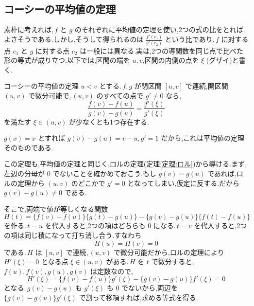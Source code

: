 \subsection{コーシーの平均値の定理}
素朴に考えれば,\,$f$ と $g$ のそれぞれに平均値の定理を使い,2つの式の比をとればよさそうである.しかし,そうして得られるのは $\frac{f'(c_1)}{g'(c_2)}$ という比であり,\,$f$ に対する点 $c_1$ と $g$ に対する点 $c_2$ は一般には異なる.実は,2つの導関数を同じ点で比べた形の等式が成り立つ.以下では,区間の端を $u,v$,区間の内側の点を $\xi$ (グザイ)と書く.

\begin{theorem}{コーシーの平均値の定理}\label{定理:コーシー平均値}
$u<v$ とする.\,$f,g$ が閉区間 $[u,v]$ で連続,開区間 $(u,v)$ で微分可能で,\,$(u,v)$ のすべての点で $g'\ne0$ なら,
\[
 \frac{f(v)-f(u)}{g(v)-g(u)}=\frac{f'(\xi)}{g'(\xi)}
\]
を満たす $\xi\in(u,v)$ が少なくとも1つ存在する.
\end{theorem}

$g(x)=x$ とすれば $g(v)-g(u)=v-u$,\,$g'=1$ だから,これは平均値の定理そのものである.

この定理も,平均値の定理と同じく,ロルの定理(定理\ref{定理:ロル})から導ける.まず,左辺の分母が $0$ でないことを確かめておこう.もし $g(v)=g(u)$ であれば,ロルの定理から $(u,v)$ のどこかで $g'=0$ となってしまい,仮定に反する.だから $g(v)-g(u)\ne0$ である.

そこで,両端で値が等しくなる関数
\[
 H(t)=\{f(v)-f(u)\}\{g(t)-g(u)\}
      -\{g(v)-g(u)\}\{f(t)-f(u)\}
\]
を作る.\,$t=u$ を代入すると,2つの項はどちらも $0$ になる.\,$t=v$ を代入すると,2つの項は同じ積になって打ち消し合う.すなわち
\[
 H(u)=H(v)=0
\]
である.\,$H$ は $[u,v]$ で連続,\,$(u,v)$ で微分可能だから,ロルの定理により $H'(\xi)=0$ となる点 $\xi\in(u,v)$ がある.\,$H$ を $t$ で微分すると,\,$f(u),f(v),g(u),g(v)$ は定数なので,
\[
 H'(\xi)=\{f(v)-f(u)\}g'(\xi)-\{g(v)-g(u)\}f'(\xi)=0
\]
となる.\,$g(v)-g(u)$ も $g'(\xi)$ も $0$ でないから,両辺を $\{g(v)-g(u)\}g'(\xi)$ で割って移項すれば,求める等式を得る.
